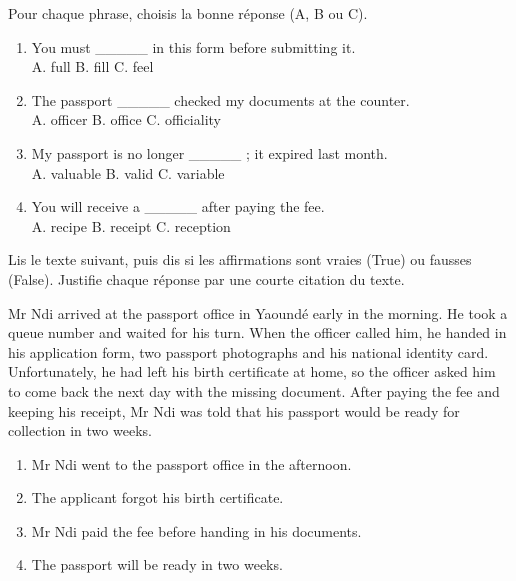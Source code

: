 \documentclass[11pt]{article}
\begin{document}
\begin{exercice}
Pour chaque phrase, choisis la bonne réponse (A, B ou C).

\begin{enumerate}
\item You must \_\_\_\_\_ in this form before submitting it.\\
A. full \hspace{1cm} B. fill \hspace{1cm} C. feel
\item The passport \_\_\_\_\_ checked my documents at the counter.\\
A. officer \hspace{1cm} B. office \hspace{1cm} C. officiality
\item My passport is no longer \_\_\_\_\_ ; it expired last month.\\
A. valuable \hspace{1cm} B. valid \hspace{1cm} C. variable
\item You will receive a \_\_\_\_\_ after paying the fee.\\
A. recipe \hspace{1cm} B. receipt \hspace{1cm} C. reception
\end{enumerate}
\end{exercice}

\begin{exercice}
Lis le texte suivant, puis dis si les affirmations sont vraies (True) ou fausses (False). Justifie chaque réponse par une courte citation du texte.

\begin{textebox}
Mr Ndi arrived at the passport office in Yaoundé early in the morning. He took a queue number and waited for his turn. When the officer called him, he handed in his application form, two passport photographs and his national identity card. Unfortunately, he had left his birth certificate at home, so the officer asked him to come back the next day with the missing document. After paying the fee and keeping his receipt, Mr Ndi was told that his passport would be ready for collection in two weeks.
\end{textebox}

\begin{enumerate}
\item Mr Ndi went to the passport office in the afternoon.
\item The applicant forgot his birth certificate.
\item Mr Ndi paid the fee before handing in his documents.
\item The passport will be ready in two weeks.
\end{enumerate}
\end{exercice}
\end{document}
